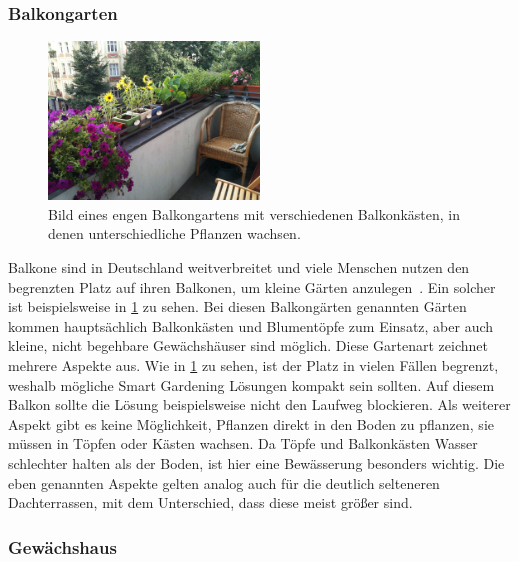 \subsubsection{Balkongarten}
\begin{figure}[!htb]
	\centering
	\includegraphics[width=0.5\textwidth]{images/Balkongarten.jpeg}
	\caption[Bild eines Balkongartens mit verschiedenen Balkonkästen.]{
		Bild eines engen Balkongartens mit verschiedenen Balkonkästen, in denen unterschiedliche Pflanzen wachsen.\footnotemark
		}
	\label{pic:balkongarten}
\end{figure}


Balkone sind in Deutschland weitverbreitet und viele Menschen nutzen den begrenzten Platz auf ihren Balkonen, um kleine Gärten anzulegen~\cite{VuMABalkon}.
Ein solcher ist beispielsweise in \cref{pic:balkongarten} zu sehen.
Bei diesen Balkongärten genannten Gärten kommen hauptsächlich Balkonkästen und Blumentöpfe zum Einsatz, aber auch kleine, nicht begehbare Gewächshäuser sind möglich.
Diese Gartenart zeichnet mehrere Aspekte aus.
Wie in \cref{pic:balkongarten} zu sehen, ist der Platz in vielen Fällen begrenzt, weshalb mögliche Smart Gardening Lösungen kompakt sein sollten.
Auf diesem Balkon sollte die Lösung beispielsweise nicht den Laufweg blockieren.
Als weiterer Aspekt gibt es keine Möglichkeit, Pflanzen direkt in den Boden zu pflanzen, sie müssen in Töpfen oder Kästen wachsen.
Da Töpfe und Balkonkästen Wasser schlechter halten als der Boden, ist hier eine Bewässerung besonders wichtig.
Die eben genannten Aspekte gelten analog auch für die deutlich selteneren Dachterrassen, mit dem Unterschied, dass diese meist größer sind.

\subsubsection{Gewächshaus}

